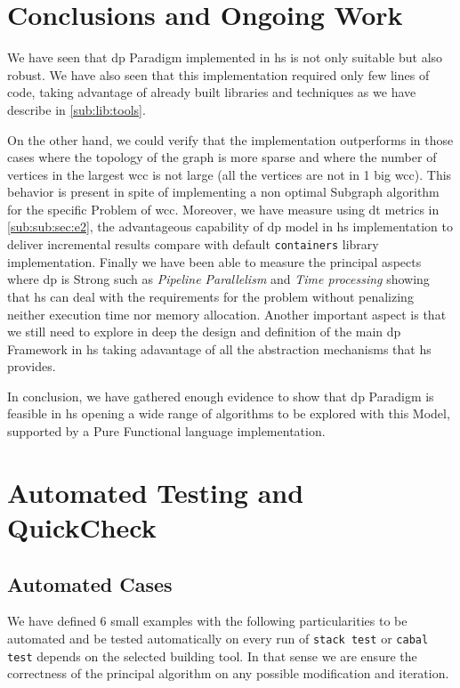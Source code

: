 \documentclass[preprint]{elsarticle}
\begin{document}
\section{Conclusions and Ongoing Work}
We have seen that \acrfull{dp} Paradigm implemented in \acrfull{hs} is not only suitable but also robust. We have also seen that this implementation required only few lines of code, taking advantage of already built libraries and techniques as we have describe in \autoref{sub:lib:tools}.

On the other hand, we could verify that the implementation outperforms in those cases where the topology of the graph is more sparse and where the number of vertices in the largest \acrshort{wcc} is not large (all the vertices are not in 1 big \acrshort{wcc}). This behavior is present in spite of implementing a non optimal Subgraph algorithm for the specific Problem of \acrshort{wcc}.
Moreover, we have measure using \acrshort{dt} metrics in \autoref{sub:sub:sec:e2}, the advantageous capability of \acrshort{dp} model in \acrshort{hs} implementation to deliver incremental results compare with default \texttt{containers} library implementation.
Finally we have been able to measure the principal aspects where \acrshort{dp} is Strong such as \textit{Pipeline Parallelism} and \textit{Time processing} showing that \acrshort{hs} can deal with the requirements for the problem without penalizing neither execution time nor memory allocation.
Another important aspect is that we still need to explore in deep the design and definition of the main \acrshort{dp} Framework in \acrshort{hs} taking adavantage of all the abstraction mechanisms that \acrshort{hs} provides.

In conclusion, we have gathered enough evidence to show that \acrfull{dp} Paradigm is feasible in \acrshort{hs} opening a wide range of algorithms to be explored with this Model, supported by a Pure Functional language implementation.



\printglossary

\appendix
\section{Automated Testing and QuickCheck}\label{apx:1}
\subsection{Automated Cases}
We have defined 6 small examples with the following particularities to be automated and be tested automatically on every run of \texttt{stack test} or \texttt{cabal test} depends on the selected building tool. In that sense
we are ensure the correctness of the principal algorithm on any possible modification and iteration. 
\end{document}
